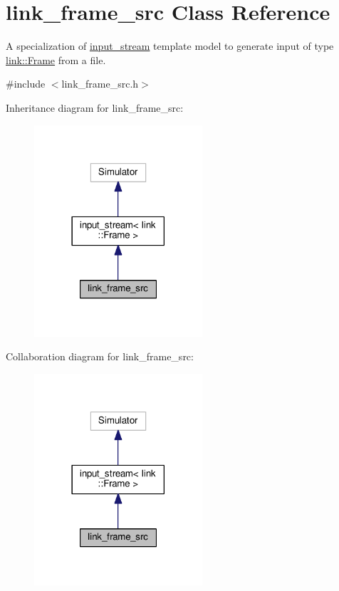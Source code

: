 \hypertarget{classlink__frame__src}{}\section{link\+\_\+frame\+\_\+src Class Reference}
\label{classlink__frame__src}


A specialization of \hyperlink{classinput__stream}{input\+\_\+stream} template model to generate input of type \hyperlink{structlink_1_1Frame}{link\+::\+Frame} from a file.  




{\ttfamily \#include $<$link\+\_\+frame\+\_\+src.\+h$>$}



Inheritance diagram for link\+\_\+frame\+\_\+src\+:\nopagebreak
\begin{figure}[H]
\begin{center}
\leavevmode
\includegraphics[width=177pt]{classlink__frame__src__inherit__graph}
\end{center}
\end{figure}


Collaboration diagram for link\+\_\+frame\+\_\+src\+:\nopagebreak
\begin{figure}[H]
\begin{center}
\leavevmode
\includegraphics[width=177pt]{classlink__frame__src__coll__graph}
\end{center}
\end{figure}
